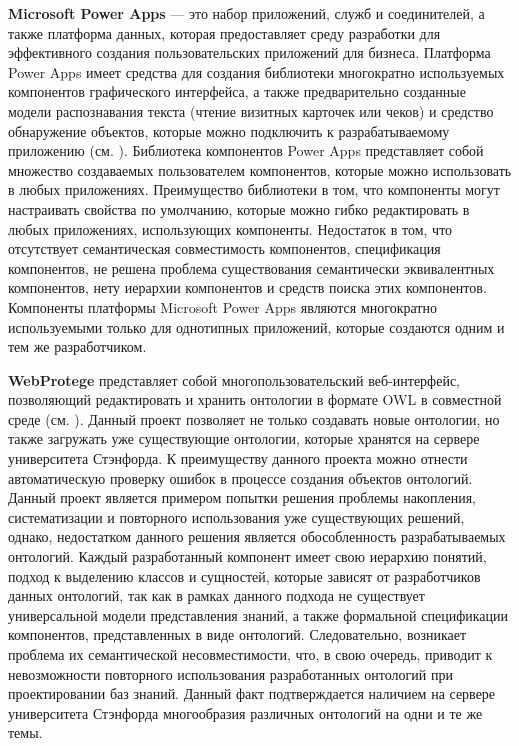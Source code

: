 \textbf{Microsoft Power Apps} — это набор приложений, служб и соединителей, а также платформа данных, которая предоставляет среду разработки для эффективного создания пользовательских приложений для бизнеса. Платформа Power Apps имеет средства для создания библиотеки многократно используемых компонентов графического интерфейса, а также предварительно созданные модели распознавания текста (чтение визитных карточек или чеков) и средство обнаружение объектов, которые можно подключить к разрабатываемому приложению (см. ). Библиотека компонентов Power Apps представляет собой множество создаваемых пользователем компонентов, которые можно использовать в любых приложениях. Преимущество библиотеки в том, что компоненты могут настраивать свойства по умолчанию, которые можно гибко редактировать в любых приложениях, использующих компоненты. Недостаток в том, что отсутствует семантическая совместимость компонентов, спецификация компонентов, не решена проблема существования семантически эквивалентных компонентов, нету иерархии компонентов и средств поиска этих компонентов. Компоненты платформы Microsoft Power Apps являются многократно используемыми только для однотипных приложений, которые создаются одним и тем же разработчиком.

\textbf{WebProtege} представляет собой многопользовательский веб-интерфейс, позволяющий редактировать и хранить онтологии в формате OWL в совместной среде (см. ). Данный проект позволяет не только создавать новые онтологии, но также загружать уже существующие онтологии, которые хранятся на сервере университета Стэнфорда. К преимуществу данного проекта можно отнести автоматическую проверку ошибок в процессе создания объектов онтологий. Данный проект является примером попытки решения проблемы накопления, систематизации и повторного использования уже существующих решений, однако, недостатком данного решения является обособленность разрабатываемых онтологий. Каждый разработанный компонент имеет свою иерархию понятий, подход к выделению классов и сущностей, которые зависят от разработчиков данных онтологий, так как в рамках данного подхода не существует универсальной модели представления знаний, а также формальной спецификации компонентов, представленных в виде онтологий. Следовательно, возникает проблема их семантической несовместимости, что, в свою очередь, приводит к невозможности повторного использования разработанных онтологий при проектировании баз знаний. Данный факт подтверждается наличием на сервере университета Стэнфорда многообразия различных онтологий на одни и те же темы.

